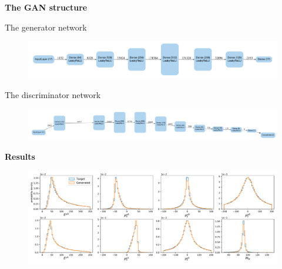 \begin{frame}{\underline{\secname}}


\begin{center}
\textbf{The GAN structure}
\end{center}

\begin{center}
{The generator network}
\end{center}
\begin{figure}[H]
\begin{center}
\includegraphics[width=\textwidth]{slides/generator_network}
\end{center}
\end{figure}

\begin{center}
{The discriminator network}
\end{center}

\begin{figure}[H]
\begin{center}
\includegraphics[width=\textwidth]{slides/discriminator_network}
\end{center}
\end{figure}

\end{frame}

\begin{frame}{\underline{\secname}}


\begin{center}
\textbf{Results}
\end{center}


\begin{figure}[H]
\begin{center}
\includegraphics[width=\textwidth]{slides/trial9_epoch39700_minigantest_mllloss_final}
\end{center}
\end{figure}





\end{frame}

